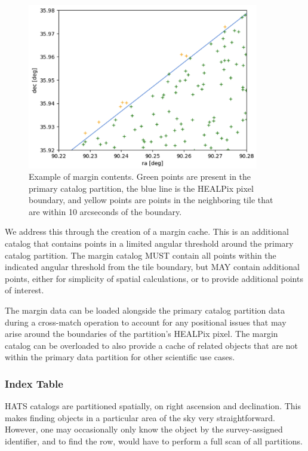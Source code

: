 \documentclass[11pt,a4paper]{ivoa}
\begin{document}
\begin{figure}
\centering
\includegraphics[width=0.9\textwidth]{margin-pix.png}
\caption{Example of margin contents. Green points are present in the primary catalog partition, the blue line is the HEALPix pixel boundary, and yellow points are points in the neighboring tile that are within 10 arcseconds of the boundary.}
\label{fig:margin}
\end{figure}

We address this through the creation of a margin cache.
This is an additional catalog that contains points in a limited angular threshold around the primary catalog partition.
The margin catalog MUST contain all points within the indicated angular threshold from the tile boundary, but MAY contain additional points, either for simplicity of spatial calculations, or to provide additional points of interest.\par

The margin data can be loaded alongside the primary catalog partition data during a cross-match operation to account for any positional issues that may arise around the boundaries of the partition's HEALPix pixel.
The margin catalog can be overloaded to also provide a cache of related objects that are not within the primary data partition for other scientific use cases.

\subsubsection{Index Table} \label{sec:index}

HATS catalogs are partitioned spatially, on right ascension and declination. 
This makes finding objects in a particular area of the sky very straightforward. 
However, one may occasionally only know the object by the survey-assigned identifier, and to find the row, would have to perform a full scan of all partitions. \par
\end{document}
